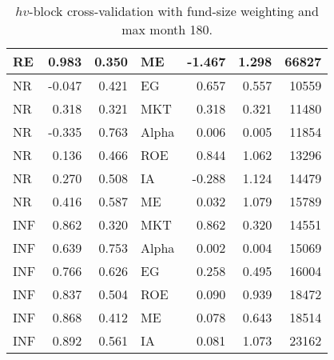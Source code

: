 \begin{table}[ht]
{\begin{tabular}{lrrlrrr}
			RE & 0.983 & 0.350 & ME & -1.467 & 1.298 & 66827 \\ 
			\hline
			NR & -0.047 & 0.421 & EG & 0.657 & 0.557 & 10559 \\ 
			NR & 0.318 & 0.321 & MKT & 0.318 & 0.321 & 11480 \\ 
			NR & -0.335 & 0.763 & Alpha & 0.006 & 0.005 & 11854 \\ 
			NR & 0.136 & 0.466 & ROE & 0.844 & 1.062 & 13296 \\ 
			NR & 0.270 & 0.508 & IA & -0.288 & 1.124 & 14479 \\ 
			NR & 0.416 & 0.587 & ME & 0.032 & 1.079 & 15789 \\ 
			\hline
			INF & 0.862 & 0.320 & MKT & 0.862 & 0.320 & 14551 \\ 
			INF & 0.639 & 0.753 & Alpha & 0.002 & 0.004 & 15069 \\ 
			INF & 0.766 & 0.626 & EG & 0.258 & 0.495 & 16004 \\ 
			INF & 0.837 & 0.504 & ROE & 0.090 & 0.939 & 18472 \\ 
			INF & 0.868 & 0.412 & ME & 0.078 & 0.643 & 18514 \\ 
			INF & 0.892 & 0.561 & IA & 0.081 & 1.073 & 23162 \\ 
			\hline
			\hline
		\end{tabular}
	}
	\caption{$hv$-block cross-validation with fund-size weighting and max month 180.} 
	\label{tab:cv_180_FW_VYP_SL}
\end{table}


